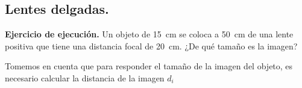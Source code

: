 \documentclass[12pt]{exam}
\begin{document}
\begin{questions}



    \setcounter{section}{6}
    \section{Lentes delgadas.}

    \setcounter{question}{16} \question \textbf{Ejercicio de ejecución.} Un objeto de \SI{15}{\centi\meter} se coloca a \SI{50}{\centi\meter} de una lente positiva que tiene una distancia focal de \SI{20}{\centi\meter}. ¿De qué tamaño es la imagen?
    
    Tomemos en cuenta que para responder el tamaño de la imagen del objeto, es necesario calcular la distancia de la imagen $d_{i}$


\end{questions}
\end{document}
